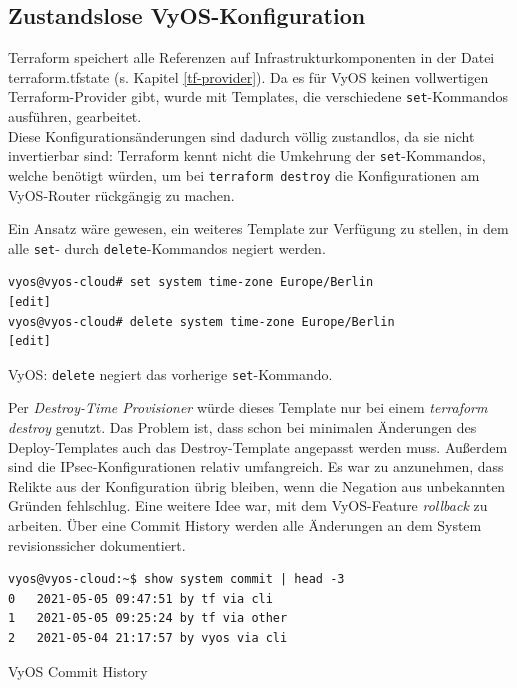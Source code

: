\subsection{Zustandslose VyOS-Konfiguration}
Terraform speichert alle Referenzen auf Infrastrukturkomponenten in der Datei terraform.tfstate (s. Kapitel \ref{tf-provider}). Da es für VyOS keinen vollwertigen Terraform-Provider gibt, wurde mit Templates, die verschiedene \texttt{set}-Kommandos ausführen, gearbeitet.\\
Diese Konfigurationsänderungen sind dadurch völlig zustandlos, da sie nicht invertierbar sind: Terraform kennt nicht die Umkehrung der \texttt{set}-Kommandos, welche benötigt würden, um bei \texttt{terraform destroy} die Konfigurationen am VyOS-Router rückgängig zu machen.

Ein Ansatz wäre gewesen, ein weiteres Template zur Verfügung zu stellen, in dem alle \texttt{set}- durch \texttt{delete}-Kommandos negiert werden.\\
\begin{listing}[h]
\begin{verbatim}
vyos@vyos-cloud# set system time-zone Europe/Berlin
[edit]
vyos@vyos-cloud# delete system time-zone Europe/Berlin
[edit]
\end{verbatim}
\caption{VyOS: \texttt{delete} negiert das vorherige \texttt{set}-Kommando.}
\label{set-delete-vyos}
\end{listing}\FloatBarrier
Per \textit{Destroy-Time Provisioner} würde dieses Template nur bei einem \textit{terraform destroy} genutzt\cite{destroytimeprovtf2021}. Das Problem ist, dass schon bei minimalen Änderungen des Deploy-Templates auch das Destroy-Template angepasst werden muss.
Außerdem sind die IPsec-Konfigurationen relativ umfangreich. Es war zu anzunehmen, dass Relikte aus der Konfiguration übrig bleiben, wenn die Negation aus unbekannten Gründen fehlschlug.
Eine weitere Idee war, mit dem VyOS-Feature \textit{rollback} zu arbeiten. Über eine Commit History werden alle Änderungen an dem System revisionssicher dokumentiert.
\begin{listing}[h]
\begin{verbatim}
vyos@vyos-cloud:~$ show system commit | head -3
0   2021-05-05 09:47:51 by tf via cli
1   2021-05-05 09:25:24 by tf via other
2   2021-05-04 21:17:57 by vyos via cli

\end{verbatim}
\caption{VyOS Commit History}
\label{commit-history-vyos}
\end{listing}\FloatBarrier
